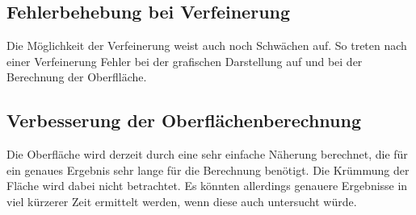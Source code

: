\documentclass[11pt, bibliography=totocnumbered]{scrartcl}
\begin{document}
\subsection{Fehlerbehebung bei Verfeinerung}
Die M\"oglichkeit der Verfeinerung weist auch noch Schw\"achen auf. So treten nach einer Verfeinerung Fehler bei der grafischen Darstellung auf und bei der Berechnung der Oberfll\"ache.
\subsection{Verbesserung der Oberfl\"achenberechnung}
Die Oberfl\"ache wird derzeit durch eine sehr einfache N\"aherung berechnet, die f\"ur ein genaues Ergebnis sehr lange f\"ur die Berechnung ben\"otigt. Die Kr\"ummung der Fl\"ache wird dabei nicht betrachtet. Es k\"onnten allerdings genauere Ergebnisse in viel k\"urzerer Zeit ermittelt werden, wenn diese auch untersucht w\"urde. 
\end{document}
